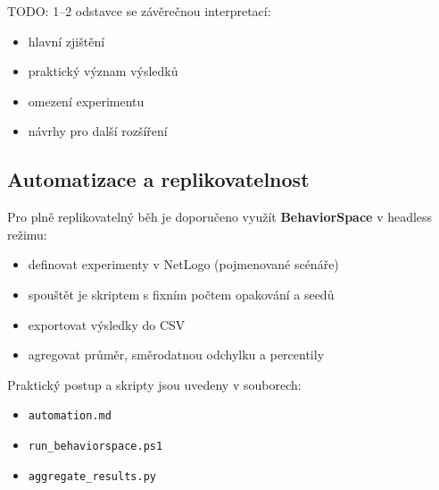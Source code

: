 TODO: 1--2 odstavce se závěrečnou interpretací:
\begin{itemize}
\item hlavní zjištění
\item praktický význam výsledků
\item omezení experimentu
\item návrhy pro další rozšíření
\end{itemize}

\subsection{Automatizace a replikovatelnost}

Pro plně replikovatelný běh je doporučeno využít \textbf{BehaviorSpace} v headless režimu:
\begin{itemize}
\item definovat experimenty v NetLogo (pojmenované scénáře)
\item spouštět je skriptem s fixním počtem opakování a seedů
\item exportovat výsledky do CSV
\item agregovat průměr, směrodatnou odchylku a percentily
\end{itemize}

Praktický postup a skripty jsou uvedeny v souborech:
\begin{itemize}
\item \texttt{automation.md}
\item \texttt{run\_behaviorspace.ps1}
\item \texttt{aggregate\_results.py}
\end{itemize}
